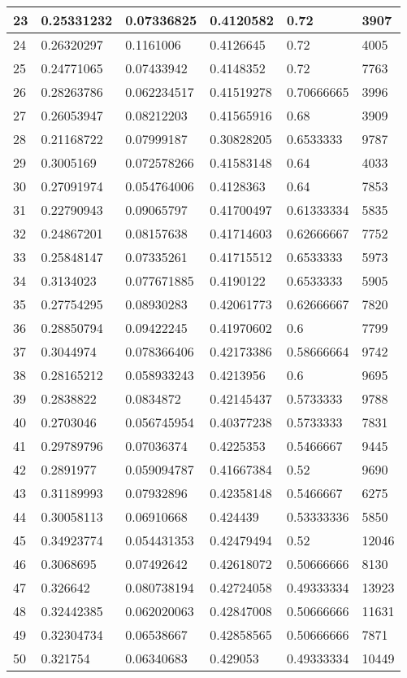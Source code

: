 \begin{longtable}{|l|l|l|l|l|l|}
23 & 0.25331232 & 0.07336825 & 0.4120582 & 0.72 & 3907 \\ \hline 
24 & 0.26320297 & 0.1161006 & 0.4126645 & 0.72 & 4005 \\ \hline 
25 & 0.24771065 & 0.07433942 & 0.4148352 & 0.72 & 7763 \\ \hline 
26 & 0.28263786 & 0.062234517 & 0.41519278 & 0.70666665 & 3996 \\ \hline 
27 & 0.26053947 & 0.08212203 & 0.41565916 & 0.68 & 3909 \\ \hline 
28 & 0.21168722 & 0.07999187 & 0.30828205 & 0.6533333 & 9787 \\ \hline 
29 & 0.3005169 & 0.072578266 & 0.41583148 & 0.64 & 4033 \\ \hline 
30 & 0.27091974 & 0.054764006 & 0.4128363 & 0.64 & 7853 \\ \hline 
31 & 0.22790943 & 0.09065797 & 0.41700497 & 0.61333334 & 5835 \\ \hline 
32 & 0.24867201 & 0.08157638 & 0.41714603 & 0.62666667 & 7752 \\ \hline 
33 & 0.25848147 & 0.07335261 & 0.41715512 & 0.6533333 & 5973 \\ \hline 
34 & 0.3134023 & 0.077671885 & 0.4190122 & 0.6533333 & 5905 \\ \hline 
35 & 0.27754295 & 0.08930283 & 0.42061773 & 0.62666667 & 7820 \\ \hline 
36 & 0.28850794 & 0.09422245 & 0.41970602 & 0.6 & 7799 \\ \hline 
37 & 0.3044974 & 0.078366406 & 0.42173386 & 0.58666664 & 9742 \\ \hline 
38 & 0.28165212 & 0.058933243 & 0.4213956 & 0.6 & 9695 \\ \hline 
39 & 0.2838822 & 0.0834872 & 0.42145437 & 0.5733333 & 9788 \\ \hline 
40 & 0.2703046 & 0.056745954 & 0.40377238 & 0.5733333 & 7831 \\ \hline 
41 & 0.29789796 & 0.07036374 & 0.4225353 & 0.5466667 & 9445 \\ \hline 
42 & 0.2891977 & 0.059094787 & 0.41667384 & 0.52 & 9690 \\ \hline 
43 & 0.31189993 & 0.07932896 & 0.42358148 & 0.5466667 & 6275 \\ \hline 
44 & 0.30058113 & 0.06910668 & 0.424439 & 0.53333336 & 5850 \\ \hline 
45 & 0.34923774 & 0.054431353 & 0.42479494 & 0.52 & 12046 \\ \hline 
46 & 0.3068695 & 0.07492642 & 0.42618072 & 0.50666666 & 8130 \\ \hline 
47 & 0.326642 & 0.080738194 & 0.42724058 & 0.49333334 & 13923 \\ \hline 
48 & 0.32442385 & 0.062020063 & 0.42847008 & 0.50666666 & 11631 \\ \hline 
49 & 0.32304734 & 0.06538667 & 0.42858565 & 0.50666666 & 7871 \\ \hline 
50 & 0.321754 & 0.06340683 & 0.429053 & 0.49333334 & 10449 \\ \hline 
\end{longtable}